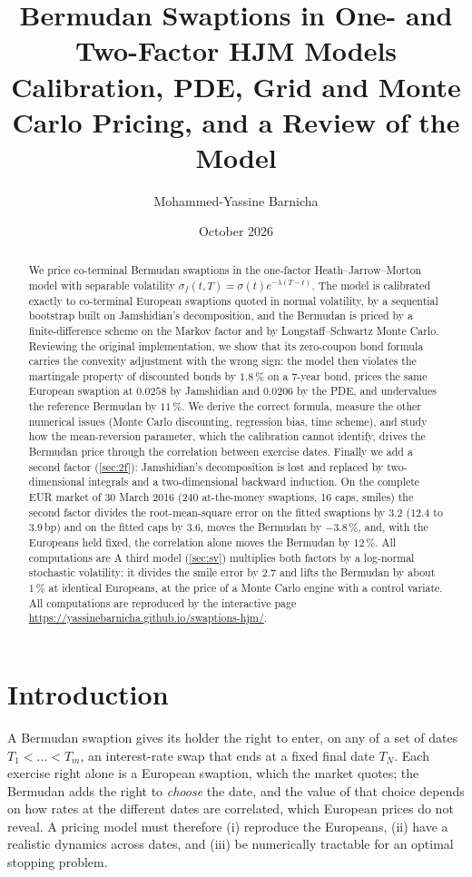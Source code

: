 \documentclass[11pt,a4paper]{article}
\title{Bermudan Swaptions in One- and Two-Factor HJM Models\\[4pt]
  \large Calibration, PDE, Grid and Monte Carlo Pricing, and a Review of the Model}
\author{Mohammed-Yassine Barnicha}
\date{October 2026}
\theoremstyle{definition}
\theoremstyle{remark}
\begin{document}
\maketitle

\begin{abstract}
\noindent We price co-terminal Bermudan swaptions in the one-factor Heath--Jarrow--Morton model with separable volatility
$\sigma_f(t,T)=\sigma(t)e^{-\lambda(T-t)}$. The model is calibrated exactly to co-terminal European swaptions quoted in normal
volatility, by a sequential bootstrap built on Jamshidian's decomposition, and the Bermudan is priced by a finite-difference
scheme on the Markov factor and by Longstaff--Schwartz Monte Carlo. Reviewing the original implementation, we show that its
zero-coupon bond formula carries the convexity adjustment with the wrong sign: the model then violates the martingale property
of discounted bonds by $1.8\,\%$ on a 7-year bond, prices the same European swaption at $0.0258$ by Jamshidian and $0.0206$ by
the PDE, and undervalues the reference Bermudan by $11\,\%$. We derive the correct formula, measure the other numerical
issues (Monte Carlo discounting, regression bias, time scheme), and study how the mean-reversion parameter, which the
calibration cannot identify, drives the Bermudan price through the correlation between exercise dates. Finally we add a second
factor (\cref{sec:2f}): Jamshidian's decomposition is lost and replaced by two-dimensional integrals and a two-dimensional backward
induction. On the complete EUR market of 30 March 2016 (240 at-the-money swaptions, 16 caps, smiles) the second factor divides
the root-mean-square error on the fitted swaptions by $3.2$ ($12.4$ to $3.9$\,bp) and on the fitted caps by $3.6$, moves the
Bermudan by $-3.8\,\%$, and, with the Europeans held fixed, the correlation alone moves the Bermudan by $12\,\%$. All computations are
A third model (\cref{sec:sv}) multiplies both factors by a log-normal stochastic volatility: it divides the smile error by $2.7$ and lifts the Bermudan by about $1\,\%$ at identical Europeans,
at the price of a Monte Carlo engine with a control variate. All computations are reproduced by the interactive page \url{https://yassinebarnicha.github.io/swaptions-hjm/}.
\end{abstract}

\tableofcontents

\section{Introduction}
A Bermudan swaption gives its holder the right to enter, on any of a set of dates $T_1<\dots<T_m$, an interest-rate swap that
ends at a fixed final date $T_N$. Each exercise right alone is a European swaption, which the market quotes; the Bermudan
adds the right to \emph{choose} the date, and the value of that choice depends on how rates at the different dates are
correlated, which European prices do not reveal. A pricing model must therefore (i) reproduce the Europeans, (ii) have a
realistic dynamics across dates, and (iii) be numerically tractable for an optimal stopping problem.
\end{document}
